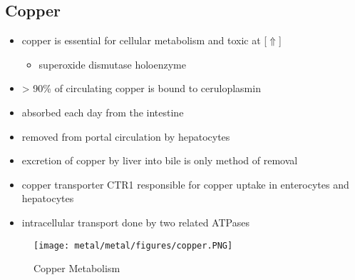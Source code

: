 \documentclass{scrartcl}
\begin{document}
\subsection{Copper}
\label{sec:org9853291}
\begin{itemize}
\item copper is essential for cellular metabolism and toxic at [\(\Uparrow\)]
\begin{itemize}
\item superoxide dismutase holoenzyme
\end{itemize}
\item \textgreater{} 90\% of circulating copper is bound to ceruloplasmin
\item absorbed each day from the intestine
\item removed from portal circulation by hepatocytes
\item excretion of copper by liver into bile is only method of removal
\item copper transporter CTR1 responsible for copper uptake in enterocytes and hepatocytes
\item intracellular transport done by two related ATPases
\end{itemize}

\begin{figure}[htbp]
\centering
\texttt{[image: metal/metal/figures/copper.PNG]}
\caption[copper]{\label{fig:orgf2ec5d4}Copper Metabolism}
\end{figure}
\end{document}

